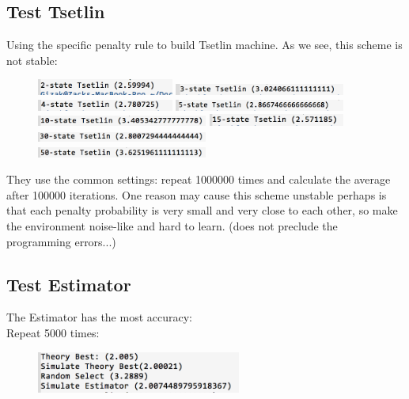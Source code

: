 \documentclass[11pt]{article}
\begin{document}
\subsection{Test Tsetlin}
Using the specific penalty rule to build Tsetlin machine. As we see, this scheme is not stable:
\begin{figure}[H]
\includegraphics[width=0.4\textwidth]{p4.png}
\includegraphics[width=0.5\textwidth]{p5.png}
\includegraphics[width=0.4\textwidth]{p6.png}
\includegraphics[width=0.5\textwidth]{p7.png}
\includegraphics[width=0.5\textwidth]{p8.png}
\includegraphics[width=0.4\textwidth]{p9.png}
\includegraphics[width=0.5\textwidth]{p10.png}
\includegraphics[width=0.5\textwidth]{p11.png}
\end{figure}

They use the common settings: repeat 1000000 times and calculate the average after 100000 iterations. One reason may cause this scheme unstable perhaps is that each penalty probability is very small and very close to each other, so make the environment noise-like and hard to learn. (does not preclude the programming errors...)
\subsection{Test Estimator}
The Estimator has the most accuracy:\\

Repeat 5000 times:
\begin{figure}[H]
\includegraphics[width=0.6\textwidth]{p14.png}
\end{figure}
\end{document}
